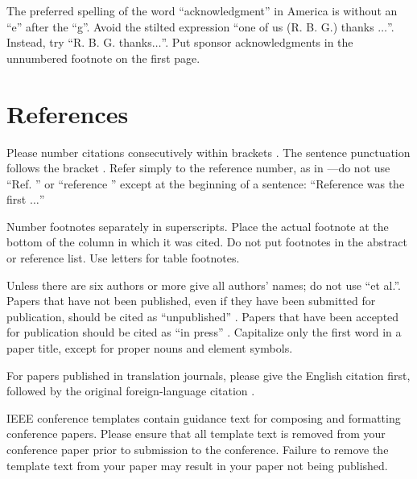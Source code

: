 \documentclass[conference]{IEEEtran}
\begin{document}
The preferred spelling of the word ``acknowledgment'' in America is without 
an ``e'' after the ``g''. Avoid the stilted expression ``one of us (R. B. 
G.) thanks $\ldots$''. Instead, try ``R. B. G. thanks$\ldots$''. Put sponsor 
acknowledgments in the unnumbered footnote on the first page.

\section*{References}

Please number citations consecutively within brackets \cite{b1}. The 
sentence punctuation follows the bracket \cite{b2}. Refer simply to the reference 
number, as in \cite{b3}---do not use ``Ref. \cite{b3}'' or ``reference \cite{b3}'' except at 
the beginning of a sentence: ``Reference \cite{b3} was the first $\ldots$''

Number footnotes separately in superscripts. Place the actual footnote at 
the bottom of the column in which it was cited. Do not put footnotes in the 
abstract or reference list. Use letters for table footnotes.

Unless there are six authors or more give all authors' names; do not use 
``et al.''. Papers that have not been published, even if they have been 
submitted for publication, should be cited as ``unpublished'' \cite{b4}. Papers 
that have been accepted for publication should be cited as ``in press'' \cite{b5}. 
Capitalize only the first word in a paper title, except for proper nouns and 
element symbols.

For papers published in translation journals, please give the English 
citation first, followed by the original foreign-language citation \cite{b6}.




\vspace{12pt}
\color{red}
IEEE conference templates contain guidance text for composing and formatting conference papers. Please ensure that all template text is removed from your conference paper prior to submission to the conference. Failure to remove the template text from your paper may result in your paper not being published.
\end{document}

